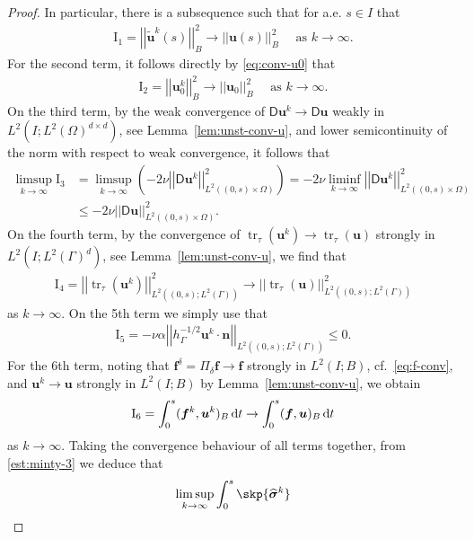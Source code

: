 \documentclass[reqno,a4paper]{amsart}
\def\norm#1{\left|\!\left| #1 \right|\!\right|}
\def\tens#1{\pmb{\mathsf{#1}}}
\def\vec#1{\boldsymbol{#1}}
\def\tr{\mathop{\mathrm{tr}}\nolimits}
\def\d{{\rm d}}
\def\dt{\,\d t}
\def\bf{\vec{f}}
\def\bn{\vec{n}}
\def\bu{\vec{u}}
\def\bsigma{\vec{\sigma}}
\def\BD{\tens{D}}
\begin{document}
\begin{proof}
		In particular, there is a subsequence such that for a.e. $s \in I$ that 
		\begin{align*}
			\mathrm{I}_1 = \norm{\widetilde{\bu}^k(s)}_B^2 \to \norm{\bu(s)}_{B}^2 \quad \text{ as }k \to \infty. 		
		\end{align*}
		For the second term, it follows directly by \eqref{eq:conv-u0} that 
		\begin{align*}
			\mathrm{I}_2 = \norm{{\bu}^k_0}_B^2 \to \norm{\bu_0}_{B}^2 \quad \text{ as }k \to \infty. 		
		\end{align*}
		On the third term, by the weak convergence of $\BD \bu^k \to \BD \bu$ weakly in $L^2(I;L^2(\Omega)^{d \times d})$, see Lemma~\ref{lem:unst-conv-u}, and lower semicontinuity of the norm with respect to weak convergence, it follows that 
		\begin{align*}
			\limsup_{k \to \infty} \mathrm{I}_3	
			& = \limsup_{k \to \infty}\left( - 2 \nu \norm{\BD \bu^k}_{L^2((0,s)\times \Omega)}^2 \right)  = - 2 \nu \liminf_{k \to \infty }  \norm{\BD \bu^k}_{L^2((0,s)\times \Omega)}^2  \\
			&\leq - 2 \nu  \norm{\BD \bu}_{L^2((0,s)\times \Omega)}^2. 
		\end{align*}
		On the fourth term, by the convergence of $\tr_{\tau}(\bu^k) \to \tr_{\tau}(\bu)$  strongly in $L^2(I;L^2(\Gamma)^d)$, see Lemma~\ref{lem:unst-conv-u}, we find that 
		\begin{align*}
			\mathrm{I}_4 = \norm{\tr_{\tau}(\bu^k)}_{L^2((0,s);L^2(\Gamma))}^2 \to \norm{\tr_{\tau}(\bu)}_{L^2((0,s);L^2(\Gamma))}^2
		\end{align*}
		as $k \to \infty$. 
		On the 5th term we simply use that 
		\begin{align*}
			\mathrm{I}_5 = - \nu \alpha \norm{h_{\Gamma}^{-1/2}\bu^k \cdot \bn}_{L^2((0,s);L^2(\Gamma))} \leq 0. 
		\end{align*}
		For the 6th term, noting that $\bf^\delta = \Pi_{\delta} \bf \to \bf$ strongly in $L^2(I;B)$, cf.~\eqref{eq:f-conv}, and $\bu^k \to \bu$ strongly in $L^2(I;B)$ by Lemma~\ref{lem:unst-conv-u}, we obtain 
		\begin{align*}
			\mathrm{I}_6 = \int_{0}^s (\bf^k, \bu^k)_B \dt  \to \int_{0}^s (\bf, \bu)_B \dt
		\end{align*}
		as $k \to \infty$. 
		Taking the convergence behaviour of all terms together, from \eqref{est:minty-3} we deduce that 
		\begin{equation}\label{est:minty-4}
			\begin{aligned}
				\limsup_{k \to \infty} \int_{0}^{s}\skp{\widehat{\bsigma}^k 
}
\end{aligned}
\end{equation}
\end{proof}
\end{document}
